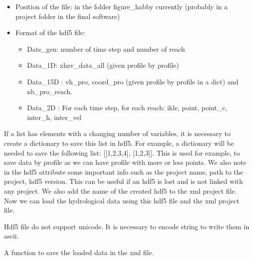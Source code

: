 \documentclass[letterpaper,10pt,english]{sphinxmanual}
\begin{document}
\begin{fulllineitems}
\begin{fulllineitems}
\begin{itemize}
\item {} 
Position of the file: in the folder  figure\_habby currently (probably in a project folder in the final software)

\item {} 
Format of the hdf5 file:
\begin{itemize}
\item {} 
Dats\_gen:  number of time step and number of reach

\item {} 
Data\_1D:  xhzv\_data\_all (given profile by profile)

\item {} 
Data\_15D :  vh\_pro, coord\_pro (given profile by profile in a dict) and nb\_pro\_reach.

\item {} 
Data\_2D : For each time step, for each reach: ikle, point, point\_c, inter\_h, inter\_vel

\end{itemize}

\end{itemize}

If a list has elements with a changing number of variables, it is necessary to create a dictionary to save
this list in hdf5. For example, a dictionary will be needed to save the following list: {[}{[}1,2,3,4{]}, {[}1,2,3{]}{]}.
This is used for example, to save data by profile as we can have profile with more or less points. We also note
in the hdf5 attribute some important info such as the project name, path to the project, hdf5 version.
This can be useful if an hdf5 is lost and is not linked with any project. We also add the name of the created
hdf5 to the xml project file. Now we can load the hydrological data using this hdf5 file and the xml project file.

Hdf5 file do not support unicode. It is necessary to encode string to write them in ascii.

\end{fulllineitems}


\begin{fulllineitems}
\label{\detokenize{index:src_GUI.hydro_GUI_2.SubHydroW.save_xml}}
A function to save the loaded data in the xml file.


\end{fulllineitems}
\end{fulllineitems}
\end{document}

